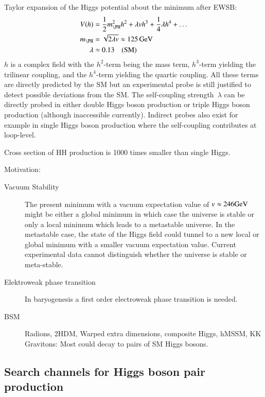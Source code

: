 Taylor expansion of the Higgs potential about the minimum after EWSB:
\begin{align*}
  V(h) &= \frac{1}{2} m_{\PH}^2 h^2 + \lambda v h^3 + \frac{1}{4} \lambda h^4 + \dots \\
  m_{\PH} &= \sqrt{2 \lambda v} \approx \SI{125}{\GeV} \\
  \lambda &\approx 0.13 \quad \text{(SM)}
\end{align*}
$h$ is a complex field with the $h^2$-term being the mass term,
$h^3$-term yielding the trilinear coupling, and the $h^4$-term
yielding the quartic coupling. All these terms are directly predicted
by the SM but an experimental probe is still justified to detect
possible deviations from the SM. The self-coupling strength~$\lambda$
can be directly probed in either double Higgs boson production or
triple Higgs boson production (although inaccessible
currently). Indirect probes also exist for example in single Higgs
boson production where the self-coupling contributes at loop-level.

Cross section of HH production is 1000 times smaller than single
Higgs. 

Motivation:
\begin{description}

\item[Vacuum Stability] The present minimum with a vacuum expectation
  value of $v \approx \si{246}{\ensuremath{\text{GeV}}}$ might be either a global minimum
  in which case the universe is stable or only a local minimum which
  leads to a metastable universe. In the metastable case, the state of
  the Higgs field could tunnel to a new local or global minimum with a
  smaller vacuum expectation value. Current experimental data cannot
  distinguish whether the universe is stable or
  meta-stable.

\item[Elektroweak phase transition] In baryogenesis a first order
  electroweak phase transition is needed.

\item[BSM] Radions, 2HDM, Warped extra dimensions, composite Higgs,
  hMSSM, KK Gravitons: Most could decay to pairs of SM Higgs bosons.

\end{description}



\subsection{Search channels for Higgs boson pair production}

